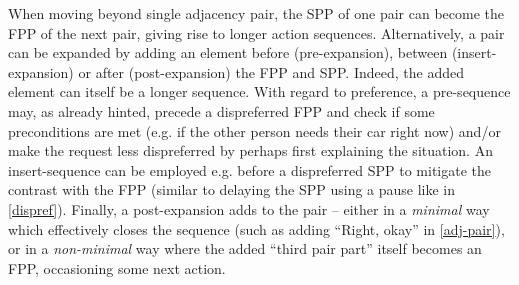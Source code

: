 \documentclass[11pt]{article}
\begin{document}
{    %
    When moving beyond single adjacency pair, the SPP of one pair can become the FPP of the next pair, giving rise to longer action sequences. 
    Alternatively, a pair can be expanded by adding an element before (pre-expansion), between (insert-expansion) or after (post-expansion) the FPP and SPP. Indeed, the added element can itself be a longer sequence.
    With regard to preference, a pre-sequence may, as already hinted, precede a dispreferred FPP and check if some preconditions are met (e.g. if the other person needs their car right now) and/or make the request less dispreferred by perhaps first explaining the situation.
    An insert-sequence can be employed e.g. before a dispreferred SPP to mitigate the contrast with the FPP (similar to delaying the SPP using a pause like in \autoref{dispref}).
    Finally, a post-expansion adds to the pair -- either in a \textit{minimal} way which effectively closes the sequence (such as adding ``Right, okay'' in \autoref{adj-pair}), or in a \textit{non-minimal} way where the added ``third pair part'' itself becomes an FPP, occasioning some next action.
}
\end{document}
